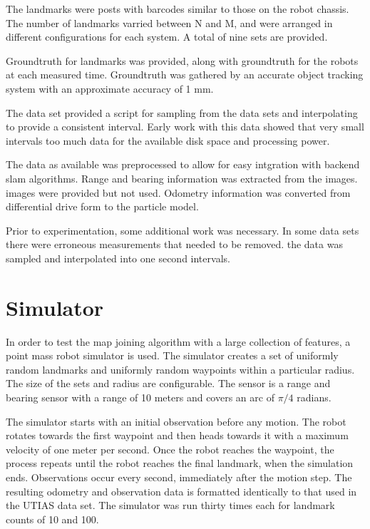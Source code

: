 \documentclass[12pt]{report}
\begin{document}
The landmarks were posts with barcodes similar to those on the robot
chassis. The number of landmarks varried between N and M, and were
arranged in different configurations for each system. A total of nine
sets are provided.

Groundtruth for landmarks was provided, along with groundtruth for the
robots at each measured time. Groundtruth was gathered by an accurate
object tracking system with an approximate accuracy of 1 mm.

The data set provided a script for sampling from the data sets and
interpolating to provide a consistent interval. Early work with this
data showed that very small intervals too much data for the available
disk space and processing power.

The data as available was preprocessed to allow for easy intgration
with backend slam algorithms. Range and bearing information was
extracted from the images. images were provided but not used. Odometry
information was converted from differential drive form to the particle
model.

Prior to experimentation, some additional work was necessary. In some
data sets there were erroneous measurements that needed to be removed.
the data was sampled and interpolated into one second intervals.


\section{Simulator}
In order to test the map joining algorithm with a large collection of
features, a point mass robot simulator is used. The simulator creates
a set of uniformly random landmarks and uniformly random waypoints
within a particular radius. The size of the sets and radius are
configurable. The sensor is a range and bearing sensor with a range of
10 meters and covers an arc of $\pi/4$ radians.

The simulator starts with an initial observation before any motion.
The robot rotates towards the first waypoint and then heads towards it
with a maximum velocity of one meter per second. Once the robot
reaches the waypoint, the process repeats until the robot reaches the
final landmark, when the simulation ends. Observations occur every
second, immediately after the motion step. The resulting odometry and
observation data is formatted identically to that used in the UTIAS
data set. The simulator was run thirty times each for landmark counts
of 10 and 100.
\end{document}
